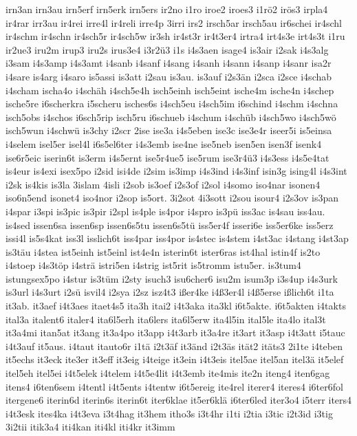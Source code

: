 {irn3an
irn3au
irn5erf
irn5erk
irn5ers
ir2no
i1ro
iroe2
iroes3
i1rö2
irös3
irpla4
ir4rar
irr3au
ir4rei
irre4l
ir4reli
irre4p
3irri
irs2
irsch5ar
irsch5au
ir6schei
ir4schl
ir4schm
ir4schn
ir4sch5r
ir4sch5w
ir3sh
ir4st3r
ir4t3er4
irtra4
irt4s3e
irt4s3t
i1ru
ir2ue3
iru2m
irup3
iru2s
irus3e4
i3r2ü3
i1s
i4s3aen
isage4
is3air
i2sak
i4s3alg
i3sam
i4s3amp
i4s3amt
i4sanb
i4sanf
i4sang
i4sanh
i4sann
i4sanp
i4sanr
isa2r
i4sare
is4arg
i4saro
is5assi
is3att
i2sau
is3au.
is3auf
i2s3än
i2sca
i2sce
i4schab
i4scham
ischa4o
i4schäh
i4sch5e4h
isch5einh
isch5eint
ische4m
ische4n
i4schep
ische5re
i6scherkra
i5scheru
isches6s
i4sch5eu
i4sch5im
i6schind
i4schm
i4schna
isch5obs
i4schos
i6sch5rip
isch5ru
i6schueb
i4schum
i4schüb
i4sch5wo
i4sch5wö
isch5wun
i4schwü
is3chy
i2scr
2ise
ise3a
i4s5eben
ise3c
ise3e4r
iseer5i
is5einsa
i4selem
isel5er
isel4l
i6s5el6ter
i4s3emb
ise4ne
ise5neb
isen5en
isen3f
isenk4
ise6r5eic
iserin6t
is3erm
i4s5ernt
ise5r4ue5
ise5rum
ise3r4ü3
i4s3ess
i4s5e4tat
is4eur
is4exi
isex5po
i2sid
isi4de
i2sim
is3imp
i4s3ind
i4s3inf
isin3g
ising4l
i4s3int
i2sk
is4kis
is3la
3islam
4isli
i2sob
is3oef
i2s3of
i2sol
i4somo
iso4nar
isonen4
iso6n5end
isonet4
iso4nor
i2sop
is5ort.
3i2sot
4i3sott
i2sou
isour4
i2s3ov
is3pan
i4spar
i3spi
is3pic
is3pir
i2spl
is4ple
is4por
i4spro
is3pü
iss3ac
is4sau
iss4au.
is4sed
issen6sa
issen6sp
issen6s5tu
issen6s5tü
iss5er4f
isseri6e
iss5er6ke
iss5erz
issi4l
is5s4kat
iss3l
isslich6t
iss4par
iss4por
is4stec
is4stem
i4st3ac
i4stang
i4st3ap
is3täu
i4stea
ist5einh
ist5einl
ist4e4n
isterin6t
ister6ras
ist4hal
istin4f
is2to
i4stoep
i4s3töp
i4strä
istri5en
i4strig
ist5rit
is5tromm
istu5er.
is3tum4
istungsex5po
i4stur
is3tüm
i2sty
isuch3
isu6cher6
isu2m
isum3p
i3s4up
i4s3urk
is3url
i4s3urt
i2sü
isvil4
i2sya
i2sz
isz4t3
ißer4ke
i4ß3er4l
i4ß5erse
ißlich6t
i1ta
it3ab.
it3aef
i4t3aes
itaet4s5
ita3h
itai2
i4t3aka
ita3kl
i6t5akte.
i6t5akten
i4takts
ital3a
italent6
italer4
ita6l5erh
ita6lers
ita6l5erw
ita4l5in
ital5le
ita4lo
ital3t
it3a4mi
itan5at
it3ang
it3a4po
it3app
i4t3arb
it3a4re
it3art
it3asp
i4t3att
i5tauc
i4t3auf
it5aus.
i4taut
itauto6r
i1tä
i2t3äf
it3änd
i2t3äs
ität2
itäts3
2i1te
i4teben
it5echs
it3eck
ite3er
it3eff
it3eig
i4teige
it3ein
i4t3eis
itel5ae
itel5an
itel3ä
it5elef
itel5eh
itel5ei
i4t5elek
i4telem
i4t5e4lit
i4t3emb
ite4mis
ite2n
iteng4
iten6gag
itens4
i6ten6sem
i4tentl
i4t5ents
i4tentw
i6t5ereig
ite4rel
iterer4
iteres4
i6ter6fol
itergene6
iterin6d
iterin6s
iterin6t
iter6klae
it5er6klä
i6ter6led
iter3o4
i5terr
iters4
i4t3esk
ites4ka
i4t3eva
i3t4hag
it3hem
itho3s
i3t4hr
i1ti
i2tia
i3tic
i2t3id
i3tig
3i2tii
itik3a4
iti4kan
iti4kl
iti4kr
it3imm
}
